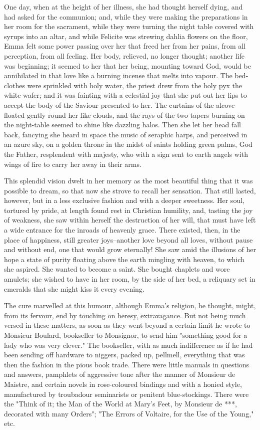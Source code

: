\documentclass{tufte-book}
\begin{document}
One day, when at the height of her illness, she had thought herself
dying, and had asked for the communion; and, while they were making the
preparations in her room for the sacrament, while they were turning the
night table covered with syrups into an altar, and while Felicite was
strewing dahlia flowers on the floor, Emma felt some power passing
over her that freed her from her pains, from all perception, from
all feeling. Her body, relieved, no longer thought; another life was
beginning; it seemed to her that her being, mounting toward God, would
be annihilated in that love like a burning incense that melts into
vapour. The bed-clothes were sprinkled with holy water, the priest drew
from the holy pyx the white wafer; and it was fainting with a celestial
joy that she put out her lips to accept the body of the Saviour
presented to her. The curtains of the alcove floated gently round her
like clouds, and the rays of the two tapers burning on the night-table
seemed to shine like dazzling halos. Then she let her head fall back,
fancying she heard in space the music of seraphic harps, and perceived
in an azure sky, on a golden throne in the midst of saints holding green
palms, God the Father, resplendent with majesty, who with a sign sent to
earth angels with wings of fire to carry her away in their arms.

This splendid vision dwelt in her memory as the most beautiful thing
that it was possible to dream, so that now she strove to recall her
sensation. That still lasted, however, but in a less exclusive fashion
and with a deeper sweetness. Her soul, tortured by pride, at length
found rest in Christian humility, and, tasting the joy of weakness, she
saw within herself the destruction of her will, that must have left a
wide entrance for the inroads of heavenly grace. There existed, then,
in the place of happiness, still greater joys--another love beyond all
loves, without pause and without end, one that would grow eternally! She
saw amid the illusions of her hope a state of purity floating above the
earth mingling with heaven, to which she aspired. She wanted to become
a saint. She bought chaplets and wore amulets; she wished to have in her
room, by the side of her bed, a reliquary set in emeralds that she might
kiss it every evening.

The cure marvelled at this humour, although Emma's religion, he thought,
might, from its fervour, end by touching on heresy, extravagance. But
not being much versed in these matters, as soon as they went beyond a
certain limit he wrote to Monsieur Boulard, bookseller to Monsignor,
to send him "something good for a lady who was very clever." The
bookseller, with as much indifference as if he had been sending off
hardware to niggers, packed up, pellmell, everything that was then the
fashion in the pious book trade. There were little manuals in questions
and answers, pamphlets of aggressive tone after the manner of Monsieur
de Maistre, and certain novels in rose-coloured bindings and with
a honied style, manufactured by troubadour seminarists or penitent
blue-stockings. There were the "Think of it; the Man of the World at
Mary's Feet, by Monsieur de ***, decorated with many Orders"; "The
Errors of Voltaire, for the Use of the Young," etc.
\end{document}
